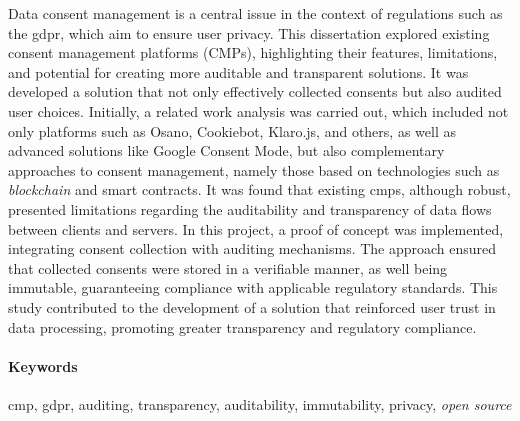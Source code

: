 Data consent management is a central issue in the context of regulations such as the \acrfull{gdpr}, which aim to ensure user privacy. This dissertation explored existing consent management platforms (CMPs), highlighting their features, limitations, and potential for creating more auditable and transparent solutions. 
It was developed a solution that not only effectively collected consents but also audited user choices. 
Initially, a related work analysis was carried out, which included not only platforms such as Osano, Cookiebot, Klaro.js, and others, as well as advanced solutions like Google Consent Mode, but also complementary approaches to consent management, namely those based on technologies such as \textit{blockchain} and smart contracts. It was found that existing \acrshort{cmp}s, although robust, presented limitations regarding the auditability and transparency of data flows between clients and servers.
In this project, a proof of concept was implemented, integrating consent collection with auditing mechanisms. The approach ensured that collected consents were stored in a verifiable manner, as well being immutable, guaranteeing compliance with applicable regulatory standards. This study contributed to the development of a solution that reinforced user trust in data processing, promoting greater transparency and regulatory compliance.

\paragraph{Keywords} \acrshort{cmp}, \acrshort{gdpr}, auditing, transparency, auditability, immutability, privacy, \textit{open source}

\cleardoublepage
